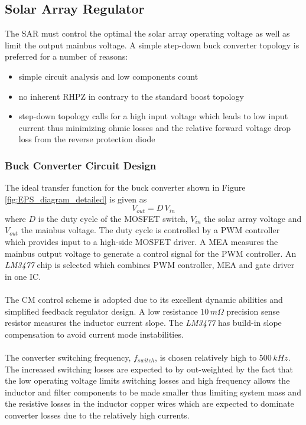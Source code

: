\subsection{Solar Array Regulator}
The \ac{SAR} must control the optimal the solar array operating voltage as well as limit the output mainbus voltage. A simple step-down buck converter topology is preferred for a number of reasons:
%
\begin{itemize}
\item simple circuit analysis and low components count
\item no inherent \ac{RHPZ} in contrary to the standard boost topology
\item step-down topology calls for a high input voltage which leads to low input current thus minimizing ohmic losses and the relative forward voltage drop loss from the reverse protection diode
\end{itemize}
%
\subsubsection{Buck Converter Circuit Design}
The ideal transfer function for the buck converter shown in Figure \ref{fig:EPS_diagram_detailed} is given as
%
\begin{equation}
V_{out}=D\,V_{in}
\end{equation}
%
where $D$ is the duty cycle of the MOSFET switch, $V_{in}$ the solar array voltage and $V_{out}$ the mainbus voltage. The duty cycle is controlled by a \ac{PWM} controller which provides input to a high-side MOSFET driver. A \ac{MEA} measures the mainbus output voltage to generate a control signal for the PWM controller. An \textit{LM3477} chip is selected which combines \ac{PWM} controller, \ac{MEA} and gate driver in one \ac{IC}.
\\
\\
The \ac{CM} control scheme is adopted due to its excellent dynamic abilities\cite[sec. 12-3-6]{Fundamentals} and simplified feedback regulator design. A low resistance $10\,m \Omega$ precision sense resistor measures the inductor current slope. The \textit{LM3477} has build-in slope compensation to avoid current mode instabilities\cite[sec. 12-1]{Fundamentals}.
\\
\\
The converter switching frequency, $f_{switch}$, is chosen relatively high to $500\,kHz$. The increased switching losses are expected to by out-weighted by the fact that the low operating voltage limits switching losses and high frequency allows the inductor and filter components to be made smaller thus limiting system mass and the resistive losses in the inductor copper wires which are expected to dominate converter losses due to the relatively high currents.

